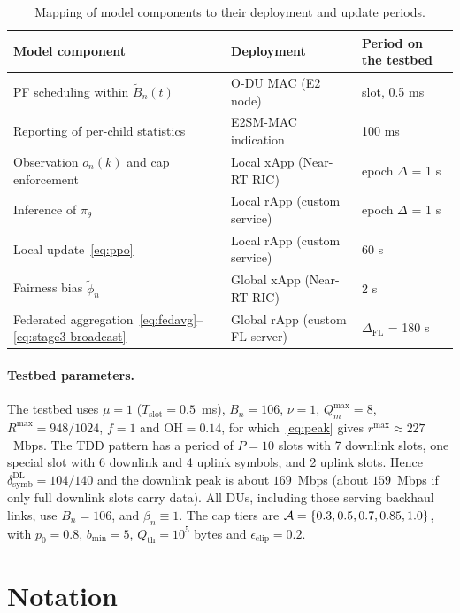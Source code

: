 \begin{EnChapter}
\begin{table}[htbp]
\centering
\small
\caption{Mapping of model components to their deployment and update periods.}
\label{tab:oran-mapping}
\begin{tabular}{@{}p{}p{}p{}@{}}
\toprule
Model component & Deployment & Period on the testbed \\
\midrule
PF scheduling within $\tilde B_n(t)$ & O-DU MAC (E2 node) & slot, 0.5 ms \\
Reporting of per-child statistics & E2SM-MAC indication & 100 ms \\
Observation $o_n(k)$ and cap enforcement & Local xApp (Near-RT RIC) & epoch $\Delta$ = 1 s \\
Inference of $\pi_\theta$ & Local rApp (custom service) & epoch $\Delta$ = 1 s \\
Local update~\eqref{eq:ppo} & Local rApp (custom service) & 60 s \\
Fairness bias $\tilde\phi_n$ & Global xApp (Near-RT RIC) & 2 s \\
Federated aggregation~\eqref{eq:fedavg}--\eqref{eq:stage3-broadcast} & Global rApp (custom FL server) & $\Delta_{\mathrm{FL}}$ = 180 s \\
\bottomrule
\end{tabular}
\end{table}

\paragraph{Testbed parameters.}
The testbed uses $\mu = 1$ ($T_{\mathrm{slot}} = 0.5$~ms), $B_n = 106$, $\nu = 1$,
$Q_m^{\max} = 8$, $R^{\max} = 948/1024$, $f = 1$ and $\mathrm{OH} = 0.14$,
for which~\eqref{eq:peak} gives $r^{\max} \approx 227$~Mbps. The TDD pattern has a
period of $P = 10$ slots with 7 downlink slots, one special slot with 6 downlink and
4 uplink symbols, and 2 uplink slots. Hence
$\delta^{\mathrm{DL}}_{\mathrm{symb}} = 104/140$ and the downlink peak is about
$169$~Mbps (about $159$~Mbps if only full downlink slots carry data). All DUs,
including those serving backhaul links, use $B_n = 106$, and $\beta_n \equiv 1$. The cap tiers are $\mathcal{A} = \{0.3, 0.5, 0.7, 0.85, 1.0\}$, with
$p_0 = 0.8$, $b_{\min} = 5$, $Q_{\mathrm{th}} = 10^5$ bytes and
$\epsilon_{\mathrm{clip}} = 0.2$.

\section{Notation}
\label{subsec:notation}


\end{EnChapter}
